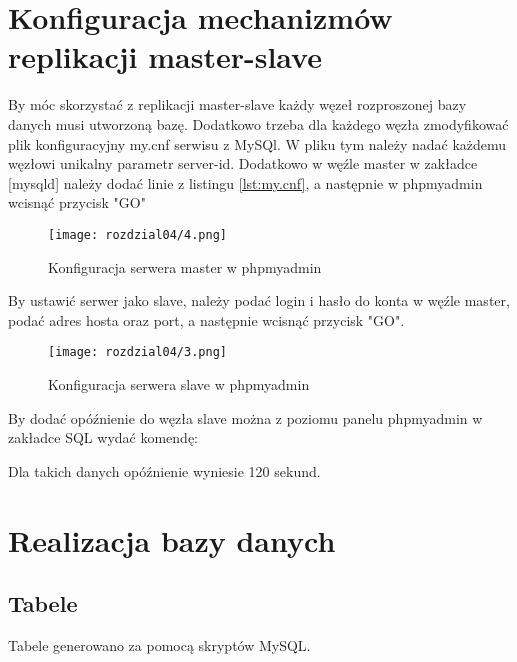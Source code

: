 \section{Konfiguracja mechanizmów replikacji master-slave}
By móc skorzystać z replikacji master-slave każdy węzeł rozproszonej bazy danych musi utworzoną bazę. Dodatkowo trzeba dla każdego węzła zmodyfikować plik konfiguracyjny my.cnf serwisu z MySQl. W pliku tym należy nadać każdemu węzłowi unikalny parametr server-id. Dodatkowo w węźle master w zakładce [mysqld] należy dodać linie z listingu \ref{lst:my.cnf}, a następnie w phpmyadmin  wcisnąć przycisk "GO"

\lssetdef


\begin{figure} [H]
	\centering
	\texttt{[image: rozdzial04/4.png]}
	\caption{Konfiguracja serwera master w phpmyadmin}
	\label{fig:phpmyadmin2}
\end{figure}


By ustawić serwer jako slave, należy podać login i hasło do konta w węźle master, podać adres hosta oraz port, a następnie wcisnąć przycisk "GO".

\begin{figure} [H]
	\centering
	\texttt{[image: rozdzial04/3.png]}
	\caption{Konfiguracja serwera slave w phpmyadmin}
	\label{fig:phpmyadmin1}
\end{figure}

By dodać opóźnienie do węzła slave można z poziomu panelu phpmyadmin w zakładce SQL wydać komendę:

\lssetdef


Dla takich danych opóźnienie wyniesie 120 sekund.

\section{Realizacja bazy danych}

\subsection{Tabele}

Tabele generowano za pomocą skryptów MySQL.

